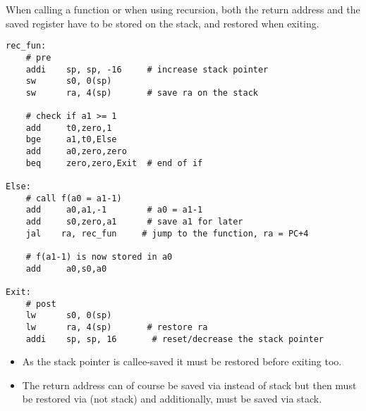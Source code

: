 \newpar{}

When calling a function or when using recursion, both the return address  and the saved register  have to be stored on the stack, and restored when exiting.
\begin{lstlisting}[language={[RISC-V]Assembler}]
rec_fun:
    # pre
    addi    sp, sp, -16     # increase stack pointer
    sw      s0, 0(sp)
    sw      ra, 4(sp)       # save ra on the stack

    # check if a1 >= 1
    add     t0,zero,1
    bge     a1,t0,Else
    add     a0,zero,zero
    beq     zero,zero,Exit  # end of if

Else:
    # call f(a0 = a1-1)
    add     a0,a1,-1        # a0 = a1-1
    add     s0,zero,a1      # save a1 for later
    jal    ra, rec_fun     # jump to the function, ra = PC+4

    # f(a1-1) is now stored in a0
    add     a0,s0,a0

Exit:
    # post
    lw      s0, 0(sp)       
    lw      ra, 4(sp)       # restore ra
    addi    sp, sp, 16       # reset/decrease the stack pointer

\end{lstlisting}
\begin{itemize}
    \item As the stack pointer is callee-saved it must be restored before exiting too.
    \item The return address  can of course be saved via  instead of stack but then  must be restored via  (not stack) and additionally,  must be saved via stack.
\end{itemize}


